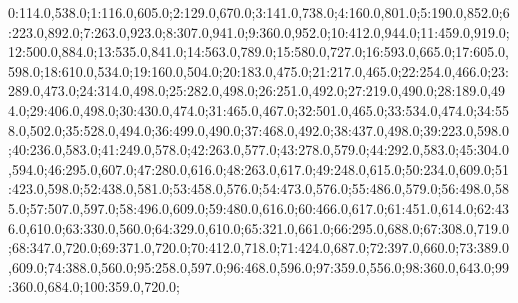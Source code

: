 0:114.0,538.0;1:116.0,605.0;2:129.0,670.0;3:141.0,738.0;4:160.0,801.0;5:190.0,852.0;6:223.0,892.0;7:263.0,923.0;8:307.0,941.0;9:360.0,952.0;10:412.0,944.0;11:459.0,919.0;12:500.0,884.0;13:535.0,841.0;14:563.0,789.0;15:580.0,727.0;16:593.0,665.0;17:605.0,598.0;18:610.0,534.0;19:160.0,504.0;20:183.0,475.0;21:217.0,465.0;22:254.0,466.0;23:289.0,473.0;24:314.0,498.0;25:282.0,498.0;26:251.0,492.0;27:219.0,490.0;28:189.0,494.0;29:406.0,498.0;30:430.0,474.0;31:465.0,467.0;32:501.0,465.0;33:534.0,474.0;34:558.0,502.0;35:528.0,494.0;36:499.0,490.0;37:468.0,492.0;38:437.0,498.0;39:223.0,598.0;40:236.0,583.0;41:249.0,578.0;42:263.0,577.0;43:278.0,579.0;44:292.0,583.0;45:304.0,594.0;46:295.0,607.0;47:280.0,616.0;48:263.0,617.0;49:248.0,615.0;50:234.0,609.0;51:423.0,598.0;52:438.0,581.0;53:458.0,576.0;54:473.0,576.0;55:486.0,579.0;56:498.0,585.0;57:507.0,597.0;58:496.0,609.0;59:480.0,616.0;60:466.0,617.0;61:451.0,614.0;62:436.0,610.0;63:330.0,560.0;64:329.0,610.0;65:321.0,661.0;66:295.0,688.0;67:308.0,719.0;68:347.0,720.0;69:371.0,720.0;70:412.0,718.0;71:424.0,687.0;72:397.0,660.0;73:389.0,609.0;74:388.0,560.0;95:258.0,597.0;96:468.0,596.0;97:359.0,556.0;98:360.0,643.0;99:360.0,684.0;100:359.0,720.0;